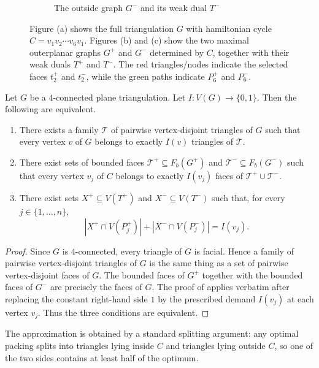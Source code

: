 \documentclass{patmorin}
\begin{document}
\begin{figure}[H]
\begin{subfigure}[t]{0.47\textwidth}
{%
}
\caption{The outside graph $G^-$ and its weak dual $T^-$}
\end{subfigure}

\caption{Figure (a) shows the full triangulation $G$ with hamiltonian cycle
$C=v_1v_2\cdots v_6v_1$. Figures (b) and (c) show the two maximal
outerplanar graphs $G^+$ and $G^-$ determined by $C$, together with their
weak duals $T^+$ and $T^-$. The red triangles/nodes indicate the selected
faces $t_2^+$ and $t_2^-$, while the green paths indicate $P_6^+$ and
$P_6^-$.}
\label{fig:4conn-three-figures}
\end{figure}

\begin{cor}\label{lem:demand-4conn}
Let $G$ be a $4$-connected plane triangulation. 
Let $I\colon V(G)\to\{0,1\}$.
Then the following are equivalent.

\begin{enumerate}
\item There exists a family $\mathcal T$ of pairwise vertex-disjoint triangles
of $G$ such that every vertex $v$ of $G$ belongs to exactly $I(v)$ triangles of
$\mathcal T$.

\item There exist sets of bounded faces
$\mathcal T^+\subseteq F_b(G^+)$ and
$\mathcal T^-\subseteq F_b(G^-)$ such that every vertex $v_j$ of $C$ belongs
to exactly $I(v_j)$ faces of $\mathcal T^+\cup\mathcal T^-$.

\item There exist sets $X^+\subseteq V(T^+)$ and $X^-\subseteq V(T^-)$
such that, for every $j\in\{1,\dots,n\}$,
\[
|X^+\cap V(P_j^+)|+|X^-\cap V(P_j^-)|=I(v_j).
\]
\end{enumerate}
\end{cor}

\begin{proof}
Since $G$ is $4$-connected, every triangle of $G$ is facial. Hence a family of pairwise vertex-disjoint triangles of $G$ is the same thing as a set of pairwise vertex-disjoint faces of $G$. The bounded faces of $G^+$ together with the bounded faces of $G^-$ are precisely the faces of $G$.
The proof of  applies verbatim after replacing the constant right-hand side $1$ by the prescribed demand $I(v_j)$ at each vertex $v_j$.
Thus the three conditions are equivalent.
\end{proof}

The approximation is obtained by a standard splitting argument: any optimal packing splits into triangles lying inside $C$ and triangles lying outside $C$, so one of the two sides contains at least half of the optimum.
\end{document}
